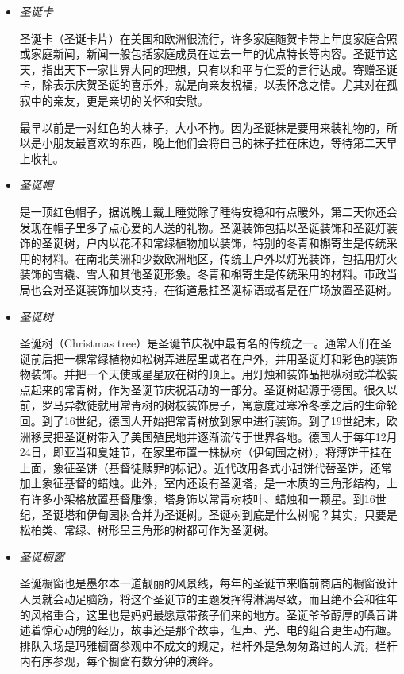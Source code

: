 \begin{itemize}
\item \emph{圣诞卡}

 圣诞卡（圣诞卡片）在美国和欧洲很流行，许多家庭随贺卡带上年度家庭合照或家庭新闻，新闻一般包括家庭成员在过去一年的优点特长等内容。圣诞节这天，指出天下一家世界大同的理想，只有以和平与仁爱的言行达成。寄赠圣诞卡，除表示庆贺圣诞的喜乐外，就是向亲友祝福，以表怀念之情。尤其对在孤寂中的亲友，更是亲切的关怀和安慰。

 最早以前是一对红色的大袜子，大小不拘。因为圣诞袜是要用来装礼物的，所以是小朋友最喜欢的东西，晚上他们会将自己的袜子挂在床边，等待第二天早上收礼。

\item \emph{圣诞帽}

 是一顶红色帽子，据说晚上戴上睡觉除了睡得安稳和有点暖外，第二天你还会发现在帽子里多了点心爱的人送的礼物。圣诞装饰包括以圣诞装饰和圣诞灯装饰的圣诞树，户内以花环和常绿植物加以装饰，特别的冬青和槲寄生是传统采用的材料。在南北美洲和少数欧洲地区，传统上户外以灯光装饰，包括用灯火装饰的雪橇、雪人和其他圣诞形象。冬青和槲寄生是传统采用的材料。市政当局也会对圣诞装饰加以支持，在街道悬挂圣诞标语或者是在广场放置圣诞树。

\item \emph{圣诞树}

 圣诞树（Christmas tree）是圣诞节庆祝中最有名的传统之一。通常人们在圣诞前后把一棵常绿植物如松树弄进屋里或者在户外，并用圣诞灯和彩色的装饰物装饰。并把一个天使或星星放在树的顶上。用灯烛和装饰品把枞树或洋松装点起来的常青树，作为圣诞节庆祝活动的一部分。圣诞树起源于德国。很久以前，罗马异教徒就用常青树的树枝装饰房子，寓意度过寒冷冬季之后的生命轮回。到了16世纪，德国人开始把常青树放到家中进行装饰。到了19世纪末，欧洲移民把圣诞树带入了美国殖民地并逐渐流传于世界各地。德国人于每年12月24日，即亚当和夏娃节，在家里布置一株枞树（伊甸园之树），将薄饼干挂在上面，象征圣饼（基督徒赎罪的标记）。近代改用各式小甜饼代替圣饼，还常加上象征基督的蜡烛。此外，室内还设有圣诞塔，是一木质的三角形结构，上有许多小架格放置基督雕像，塔身饰以常青树枝叶、蜡烛和一颗星。到16世纪，圣诞塔和伊甸园树合并为圣诞树。圣诞树到底是什么树呢？其实，只要是松柏类、常绿、树形呈三角形的树都可作为圣诞树。

\item \emph{圣诞橱窗}

 圣诞橱窗也是墨尔本一道靓丽的风景线，每年的圣诞节来临前商店的橱窗设计人员就会动足脑筋，将这个圣诞节的主题发挥得淋漓尽致，而且绝不会和往年的风格重合，这里也是妈妈最愿意带孩子们来的地方。圣诞爷爷醇厚的嗓音讲述着惊心动魄的经历，故事还是那个故事，但声、光、电的组合更生动有趣。排队入场是玛雅橱窗参观中不成文的规定，栏杆外是急匆匆路过的人流，栏杆内有序参观，每个橱窗有数分钟的演绎。

\end{itemize}

